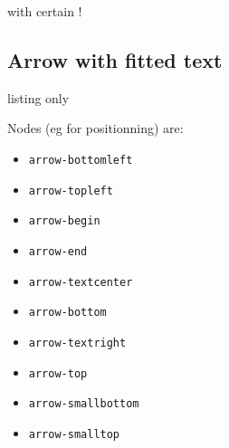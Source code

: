\documentclass[11pt,a4paper]{ltxdoc}
\begin{document}
\begin{DemoCode}{}
 with
 certain
!
\end{DemoCode}

\pagebreak

\subsection{Arrow with fitted text}

\begin{DemoCode}{listing only}

\end{DemoCode}

Nodes (eg for positionning) are:
%
\begin{multicols}{2}
	\begin{itemize}
		\item \texttt{arrow-bottomleft}
		\item \texttt{arrow-topleft}
		\item \texttt{arrow-begin}
		\item \texttt{arrow-end}
		\item \texttt{arrow-textcenter}
		\item \texttt{arrow-bottom}
		\item \texttt{arrow-textright}
		\item \texttt{arrow-top}
		\item \texttt{arrow-smallbottom}
		\item \texttt{arrow-smalltop}
	\end{itemize}
\end{multicols}

\begin{DemoCode}{}
\end{DemoCode}

\begin{DemoCode}{}
\end{DemoCode}
\end{document}
